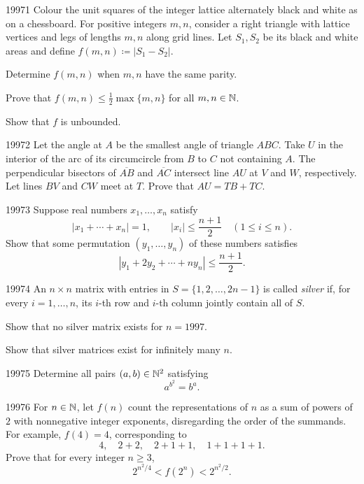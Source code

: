 
\begin{problem}{1997}{1}
Colour the unit squares of the integer lattice alternately black and white as on a chessboard. For positive integers $m, n$, consider a right triangle with lattice vertices and legs of lengths $m, n$ along grid lines. Let $S_1, S_2$ be its black and white areas and define $f(m, n)\coloneqq|S_1-S_2|$.
\begin{problemsubparts}
    \item Determine $f(m, n)$ when $m, n$ have the same parity.
    \item Prove that $\displaystyle f(m, n)\leq\frac12\max\{m, n\}$ for all $m, n\in\mathbb{N}$.
    \item Show that $f$ is unbounded.
\end{problemsubparts}
\end{problem}

\begin{problem}{1997}{2}
Let the angle at $A$ be the smallest angle of triangle $ABC$. Take $U$ in the interior of the arc of its circumcircle from $B$ to $C$ not containing $A$. The perpendicular bisectors of $\overline{AB}$ and $\overline{AC}$ intersect line $AU$ at $V$ and $W$, respectively. Let lines $BV$ and $CW$ meet at $T$. Prove that $AU=TB+TC$.
\end{problem}

\begin{problem}{1997}{3}
Suppose real numbers $x_1, \dots, x_n$ satisfy
\[
    |x_1+\cdots+x_n|=1,\qquad |x_i|\leq\frac{n+1}{2}\quad(1\leq i\leq n).
\]
Show that some permutation $(y_1, \dots, y_n)$ of these numbers satisfies
\[
    |y_1+2y_2+\cdots+ny_n|\leq\frac{n+1}{2}.
\]
\end{problem}

\begin{problem}{1997}{4}
An $n\times n$ matrix with entries in $S=\{1, 2, \dots, 2n-1\}$ is called \emph{silver} if, for every $i=1, \dots, n$, its $i$-th row and $i$-th column jointly contain all of $S$.
\begin{problemsubparts}
    \item Show that no silver matrix exists for $n=1997$.
    \item Show that silver matrices exist for infinitely many $n$.
\end{problemsubparts}
\end{problem}

\begin{problem}{1997}{5}
Determine all pairs $(a, b)\in\mathbb{N}^2$ satisfying
\[
    a^{b^2}=b^a.
\]
\end{problem}

\begin{problem}{1997}{6}
For $n\in\mathbb{N}$, let $f(n)$ count the representations of $n$ as a sum of powers of $2$ with nonnegative integer exponents, disregarding the order of the summands. For example, $f(4)=4$, corresponding to
\[
    4,\quad 2+2,\quad 2+1+1,\quad 1+1+1+1.
\]
Prove that for every integer $n\geq3$,
\[
    2^{n^2/4}<f(2^n)<2^{n^2/2}.
\]
\end{problem}
